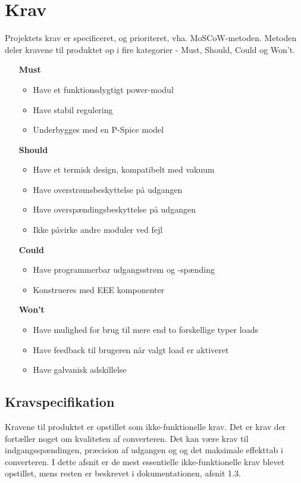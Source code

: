 
\chapter{Krav}
Projektets krav er specificeret, og prioriteret, vha. MoSCoW-metoden\cite{MoSCoW}. Metoden deler kravene til produktet op i fire kategorier - Must, Should, Could og Won't.

\begin{itemize}
	\item[\textbf{Must}]
	\begin{itemize}
		\item Have et funktionsdygtigt power-modul
		\item Have stabil regulering
		\item Underbygges med en P-Spice model
		
	\end{itemize}
	\item[\textbf{Should}]
	\begin{itemize}
		\item Have et termisk design, kompatibelt med vakuum
		\item Have overstrømsbeskyttelse på udgangen
		\item Have overspændingsbeskyttelse på udgangen
		\item Ikke påvirke andre moduler ved fejl
		
	\end{itemize}
	\item[\textbf{Could}] 
	\begin{itemize}
		\item Have programmerbar udgangsstrøm og -spænding
		\item Konstrueres med EEE komponenter
		
	\end{itemize}
	\item[\textbf{Won't}]
	\begin{itemize}
		\item Have mulighed for brug til mere end to forskellige typer loads
		\item Have feedback til brugeren når valgt load er aktiveret
		\item Have galvanisk adskillelse
		
	\end{itemize}
\end{itemize}

\section{Kravspecifikation}
Kravene til produktet er opstillet som ikke-funktionelle krav. Det er krav der fortæller noget om kvaliteten af converteren. Det kan være krav til indgangsspændingen, præcision af udgangen og og det maksimale effekttab i converteren. I dette afsnit er de mest essentielle ikke-funktionelle krav blevet opstillet, mens resten er beskrevet i dokumentationen, afsnit 1.3.

